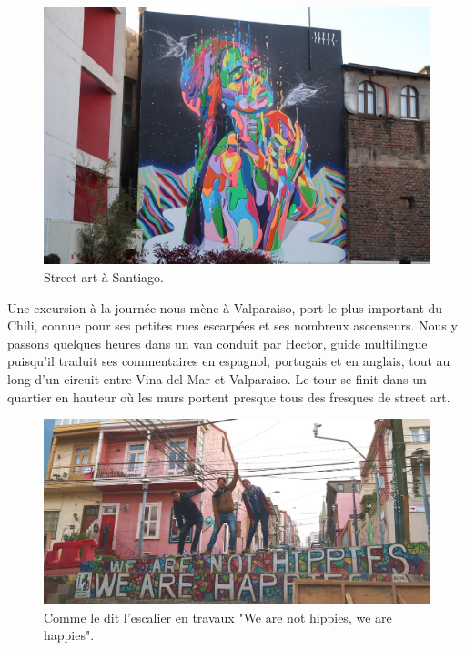 \begin{figure}
\centering
\includegraphics{images/20180904_santiagostreet.JPG}
\caption{Street art à Santiago.}
\end{figure}

Une excursion à la journée nous mène à Valparaiso, port le plus
important du Chili, connue pour ses petites rues escarpées et ses
nombreux ascenseurs. Nous y passons quelques heures dans un van conduit
par Hector, guide multilingue puisqu'il traduit ses commentaires en
espagnol, portugais et en anglais, tout au long d'un circuit entre Vina
del Mar et Valparaiso. Le tour se finit dans un quartier en hauteur où
les murs portent presque tous des fresques de street art.

\begin{figure}
\centering
\includegraphics{images/20180904_valparaiso.JPG}
\caption{Comme le dit l'escalier en travaux "We are not hippies, we are
happies".}
\end{figure}

